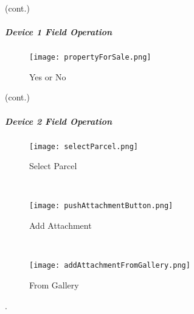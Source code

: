 {\footnotesize (cont.)}
\vspace{.5in}

\vspace{2.75in}

\vspace{3in}



\clearpage

\subparagraph*{Device 1 Field Operation}
\begin{wrapfigure}{r}{0.4\textwidth}
\centering
    \texttt{[image: propertyForSale.png]}
\caption{Yes or No}
\end{wrapfigure}

{\footnotesize (cont.)}
\vspace{.5in}


\clearpage
\subparagraph{Device 2 Field Operation}

\begin{wrapfigure}{r}{0.4\textwidth}
\centering
    \texttt{[image: selectParcel.png]}
\caption {Select Parcel}
\vspace{.05in}

\HRule \\[.4cm] %
\vspace{.1in}

    \texttt{[image: pushAttachmentButton.png]}
\caption{Add Attachment}
\vspace{.05in}

\HRule \\[.4cm] %
\vspace{.1in}

    \texttt{[image: addAttachmentFromGallery.png]}
\caption{From Gallery}
\end{wrapfigure}

.

